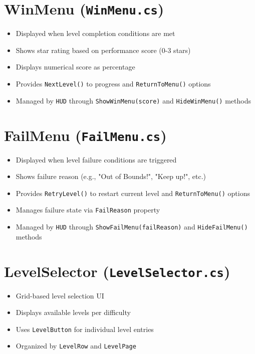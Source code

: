 \documentclass{report}
\begin{document}
\section{WinMenu (\texttt{WinMenu.cs})}
\begin{itemize}[noitemsep]
	\item Displayed when level completion conditions are met
	\item Shows star rating based on performance score (0-3 stars)
	\item Displays numerical score as percentage
	\item Provides \texttt{NextLevel()} to progress and \texttt{ReturnToMenu()} options
	\item Managed by \texttt{HUD} through \texttt{ShowWinMenu(score)} and \texttt{HideWinMenu()} methods
\end{itemize}

\section{FailMenu (\texttt{FailMenu.cs})}
\begin{itemize}[noitemsep]
	\item Displayed when level failure conditions are triggered
	\item Shows failure reason (e.g., "Out of Bounds!", "Keep up!", etc.)
	\item Provides \texttt{RetryLevel()} to restart current level and \texttt{ReturnToMenu()} options
	\item Manages failure state via \texttt{FailReason} property
	\item Managed by \texttt{HUD} through \texttt{ShowFailMenu(failReason)} and \texttt{HideFailMenu()} methods
\end{itemize}

\section{LevelSelector (\texttt{LevelSelector.cs})}
\begin{itemize}[noitemsep]
	\item Grid-based level selection UI
	\item Displays available levels per difficulty
	\item Uses \texttt{LevelButton} for individual level entries
	\item Organized by \texttt{LevelRow} and \texttt{LevelPage}
\end{itemize}
\end{document}
